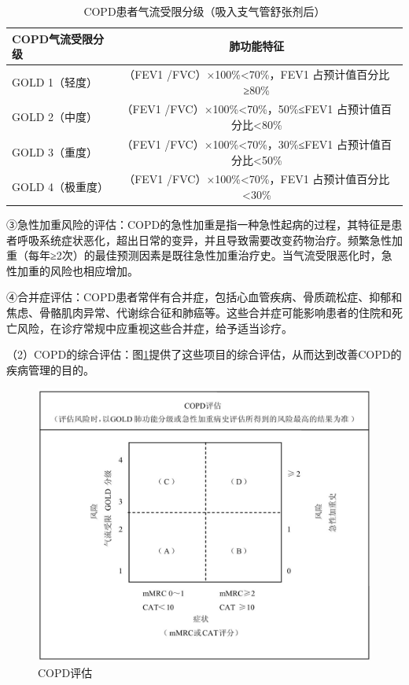 \begin{longtable}[]{lc}
  \caption{COPD患者气流受限分级（吸入支气管舒张剂后）}
  \label{tab1-4-2}\\
\toprule
COPD气流受限分级 & 肺功能特征\tabularnewline
\midrule
\endhead
GOLD 1（轻度） & （FEV{1} /FVC）×100\%\textless{}70\%，FEV{1}
占预计值百分比≥80\%\tabularnewline
GOLD 2（中度） & （FEV{1} /FVC）×100\%\textless{}70\%，50\%≤FEV{1}
占预计值百分比\textless{}80\%\tabularnewline
GOLD 3（重度） & （FEV{1} /FVC）×100\%\textless{}70\%，30\%≤FEV{1}
占预计值百分比\textless{}50\%\tabularnewline
GOLD 4（极重度） & （FEV{1} /FVC）×100\%\textless{}70\%，FEV{1}
占预计值百分比\textless{}30\%\tabularnewline
\bottomrule
\end{longtable}

③急性加重风险的评估：COPD的急性加重是指一种急性起病的过程，其特征是患者呼吸系统症状恶化，超出日常的变异，并且导致需要改变药物治疗。频繁急性加重（每年≥2次）的最佳预测因素是既往急性加重治疗史。当气流受限恶化时，急性加重的风险也相应增加。

④合并症评估：COPD患者常伴有合并症，包括心血管疾病、骨质疏松症、抑郁和焦虑、骨骼肌肉异常、代谢综合征和肺癌等。这些合并症可能影响患者的住院和死亡风险，在诊疗常规中应重视这些合并症，给予适当诊疗。

（2）COPD的综合评估：图\ref{fig1-4-3}提供了这些项目的综合评估，从而达到改善COPD的疾病管理的目的。

\begin{figure}[!htbp]
 \centering
 \includegraphics{./images/Image00005.jpg}
 \captionsetup{justification=centering}
 \caption{COPD评估}
 \label{fig1-4-3}
  \end{figure} 

